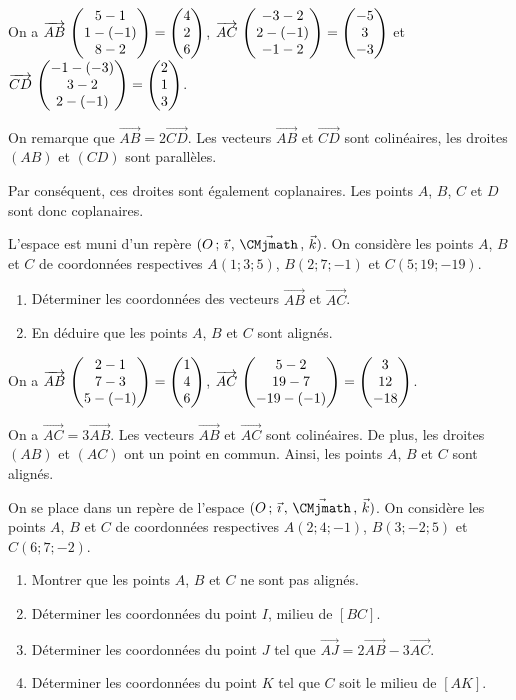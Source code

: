 \documentclass[11pt,fleqn, openany]{book} %
\begin{document}
\begin{solution}
On a $\coorde{AB}{5-1}{1-(-1)}{8-2}=\coordbe{4}{2}{6}$, $\coorde{AC}{-3-2}{2-(-1)}{-1-2}=\coordbe{-5}{3}{-3}$ et $\coorde{CD}{-1-(-3)}{3-2}{2-(-1)}=\coordbe{2}{1}{3}$.

On remarque que $\overrightarrow{AB}=2\overrightarrow{CD}$. Les vecteurs $\overrightarrow{AB}$ et $\overrightarrow{CD}$ sont colinéaires, les droites $(AB)$ et $(CD)$ sont parallèles.

Par conséquent, ces droites sont également coplanaires. Les points $A$, $B$, $C$ et $D$ sont donc coplanaires.\end{solution}




\begin{exercise}[topic=geo03]L'espace est muni d'un repère $\Oijk$. On considère les points $A$, $B$ et $C$ de coordonnées respectives $A(1;3;5)$, $B(2;7;-1)$ et $C(5;19;-19)$.
\begin{enumerate}
\item Déterminer les coordonnées des vecteurs $\overrightarrow{AB}$ et $\overrightarrow{AC}$.
\item En déduire que les points $A$, $B$ et $C$ sont alignés.
\end{enumerate}\end{exercise}


\begin{solution}On a $\coorde{AB}{2-1}{7-3}{5-(-1)}=\coordbe{1}{4}{6}$, $\coorde{AC}{5-2}{19-7}{-19-(-1)}=\coordbe{3}{12}{-18}$.

On a $\overrightarrow{AC}=3\overrightarrow{AB}$. Les vecteurs $\overrightarrow{AB}$ et $\overrightarrow{AC}$ sont colinéaires. De plus, les droites $(AB)$ et $(AC)$ ont un point en commun. Ainsi, les points $A$, $B$ et $C$ sont alignés.\end{solution}



\begin{exercise}[topic=geo03]On se place dans un repère de l'espace $\Oijk$. On considère les points $A$, $B$ et $C$ de coordonnées respectives $A(2;4;-1)$, $B(3;-2;5)$ et $C(6;7;-2)$.
\begin{enumerate}
\item Montrer que les points $A$, $B$ et $C$ ne sont pas alignés.
\item Déterminer les coordonnées du point $I$, milieu de $[BC]$.
\item Déterminer les coordonnées du point $J$ tel que $\overrightarrow{AJ}=2\overrightarrow{AB}-3\overrightarrow{AC}$.
\item Déterminer les coordonnées du point $K$ tel que $C$ soit le milieu de $[AK]$.
\end{enumerate}\end{exercise}
\end{document}
